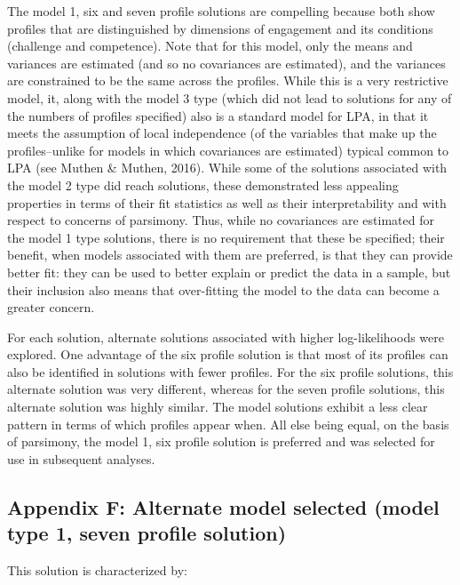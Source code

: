 \documentclass[]{book}
\theoremstyle{definition}
\theoremstyle{definition}
\theoremstyle{definition}
\theoremstyle{remark}
\begin{document}
The model 1, six and seven profile solutions are compelling because both
show profiles that are distinguished by dimensions of engagement and its
conditions (challenge and competence). Note that for this model, only
the means and variances are estimated (and so no covariances are
estimated), and the variances are constrained to be the same across the
profiles. While this is a very restrictive model, it, along with the
model 3 type (which did not lead to solutions for any of the numbers of
profiles specified) also is a standard model for LPA, in that it meets
the assumption of local independence (of the variables that make up the
profiles--unlike for models in which covariances are estimated) typical
common to LPA (see Muthen \& Muthen, 2016). While some of the solutions
associated with the model 2 type did reach solutions, these demonstrated
less appealing properties in terms of their fit statistics as well as
their interpretability and with respect to concerns of parsimony. Thus,
while no covariances are estimated for the model 1 type solutions, there
is no requirement that these be specified; their benefit, when models
associated with them are preferred, is that they can provide better fit:
they can be used to better explain or predict the data in a sample, but
their inclusion also means that over-fitting the model to the data can
become a greater concern.

For each solution, alternate solutions associated with higher
log-likelihoods were explored. One advantage of the six profile solution
is that most of its profiles can also be identified in solutions with
fewer profiles. For the six profile solutions, this alternate solution
was very different, whereas for the seven profile solutions, this
alternate solution was highly similar. The model solutions exhibit a
less clear pattern in terms of which profiles appear when. All else
being equal, on the basis of parsimony, the model 1, six profile
solution is preferred and was selected for use in subsequent analyses.

\subsection{Appendix F: Alternate model selected (model type 1, seven
profile
solution)}\label{appendix-f-alternate-model-selected-model-type-1-seven-profile-solution}

This solution is characterized by:
\end{document}
